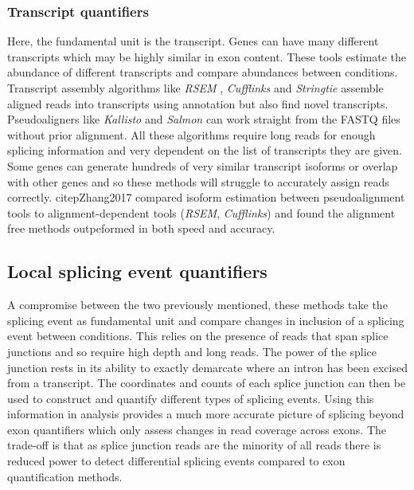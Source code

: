 \subsubsection{Transcript quantifiers}

Here, the fundamental unit is the transcript. Genes can have many different transcripts which may be highly similar in exon content.
These tools estimate the abundance of different transcripts and compare abundances between conditions.
Transcript assembly algorithms like \textit{RSEM} \citep{Li2011}, \textit{Cufflinks} \citep{Trapnell2010} and \textit{Stringtie} \citep{Pertea2015} assemble aligned reads into transcripts using annotation but also find novel transcripts.
Pseudoaligners like \textit{Kallisto} \citep{Bray2016} and \textit{Salmon} \citep{Patro2017} can work straight from the FASTQ files without prior alignment.  
All these algorithms require long reads for enough splicing information and very dependent on the list of transcripts they are given. 
Some genes can generate hundreds of very similar transcript isoforms or overlap with other genes and so these methods will struggle to accurately assign reads correctly.
citep{Zhang2017} compared isoform estimation between pseudoalignment tools to alignment-dependent tools (\textit{RSEM}, \textit{Cufflinks}) and found the alignment free methods outpeformed in both speed and accuracy.


\subsection{Local splicing event quantifiers}

A compromise between the two previously mentioned, these methods take the splicing event as fundamental unit and compare changes in inclusion of a splicing event between conditions. 
This relies on the presence of reads that span splice junctions and so require high depth and long reads.
The power of the splice junction rests in its ability to exactly demarcate where an intron has been excised from a transcript. 
The coordinates and counts of each splice junction can then be used to construct and quantify different types of splicing events.
Using this information in analysis provides a much more accurate picture of splicing beyond exon quantifiers which only assess changes in read coverage across exons.
The trade-off is that as splice junction reads are the minority of all reads there is reduced power to detect differential splicing events compared to exon quantification methods.

